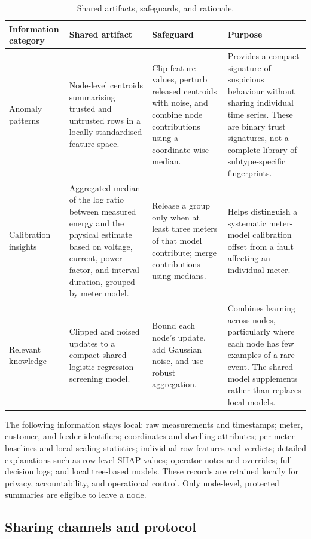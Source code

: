 \begin{table}[htbp]
\centering
\small
\caption{Shared artifacts, safeguards, and rationale.}
\label{tab:goal4-sharing}
\begin{tabularx}{\textwidth}{@{}p{2.5cm} p{4.0cm} p{3.5cm} X@{}}
\toprule
Information category & Shared artifact & Safeguard & Purpose \\
\midrule
Anomaly patterns & Node-level centroids summarising trusted and untrusted rows in a locally standardised feature space. & Clip feature values, perturb released centroids with noise, and combine node contributions using a coordinate-wise median. & Provides a compact signature of suspicious behaviour without sharing individual time series. These are binary trust signatures, not a complete library of subtype-specific fingerprints. \\
\addlinespace
Calibration insights & Aggregated median of the log ratio between measured energy and the physical estimate based on voltage, current, power factor, and interval duration, grouped by meter model. & Release a group only when at least three meters of that model contribute; merge contributions using medians. & Helps distinguish a systematic meter-model calibration offset from a fault affecting an individual meter. \\
\addlinespace
Relevant knowledge & Clipped and noised updates to a compact shared logistic-regression screening model. & Bound each node's update, add Gaussian noise, and use robust aggregation. & Combines learning across nodes, particularly where each node has few examples of a rare event. The shared model supplements rather than replaces local models. \\
\bottomrule
\end{tabularx}
\end{table}

The following information stays local: raw measurements and timestamps; meter, customer, and feeder identifiers; coordinates and dwelling attributes; per-meter baselines and local scaling statistics; individual-row features and verdicts; detailed explanations such as row-level SHAP values; operator notes and overrides; full decision logs; and local tree-based models. These records are retained locally for privacy, accountability, and operational control. Only node-level, protected summaries are eligible to leave a node.

\subsection{Sharing channels and protocol}
